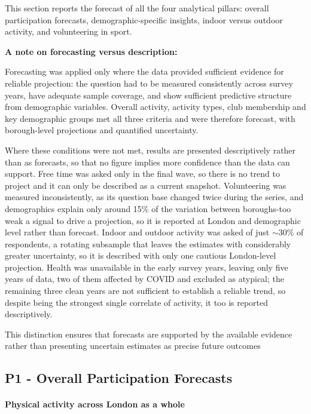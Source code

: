 \documentclass[ %
                    author={Ashrey Ashrey, Sanya Kapoor, Trisha Sharma, Yash Bhooshan Pandloskar},
                supervisor={Dr. Dalila O’Grady},
                    degree={MSc},
                     title={Using machine learning to forecast physical activity participation, volunteering and activity patterns in London},
                  subtitle={},
                      type={},
                      year={2021}]{dissertation}
\begin{document}
\noindent
This section reports the forecast of all the four analytical pillars: overall participation forecasts, demographic-specific insights, indoor versus outdoor activity, and volunteering in sport.

\noindent
\textbf{A note on forecasting versus description:}

Forecasting was applied only where the data provided sufficient evidence for reliable projection: the question had to be measured consistently across survey years, have adequate sample coverage, and show sufficient predictive structure from demographic variables. Overall activity, activity types, club membership and key demographic groups met all three criteria and were therefore forecast, with borough-level projections and quantified uncertainty.

Where these conditions were not met, results are presented descriptively rather than as forecasts, so that no figure implies more confidence than the data can support. Free time was asked only in the final wave, so there is no trend to project and it can only be described as a current snapshot. Volunteering was measured inconsistently, as its question base changed twice during the series, and demographics explain only around 15\% of the variation between boroughs-too weak a signal to drive a projection, so it is reported at London and demographic level rather than forecast. Indoor and outdoor activity was asked of just $\sim$30\% of respondents, a rotating subsample that leaves the estimates with considerably greater uncertainty, so it is described with only one cautious London-level projection. Health was unavailable in the early survey years, leaving only five years of data, two of them affected by COVID and excluded as atypical; the remaining three clean years are not sufficient to establish a reliable trend, so despite being the strongest single correlate of activity, it too is reported descriptively.

This distinction ensures that forecasts are supported by the available evidence rather than presenting uncertain estimates as precise future outcomes

\FloatBarrier
\subsection{P1 - Overall Participation Forecasts}

\noindent
\paragraph{Physical activity across London as a whole}
\noindent
\end{document}
